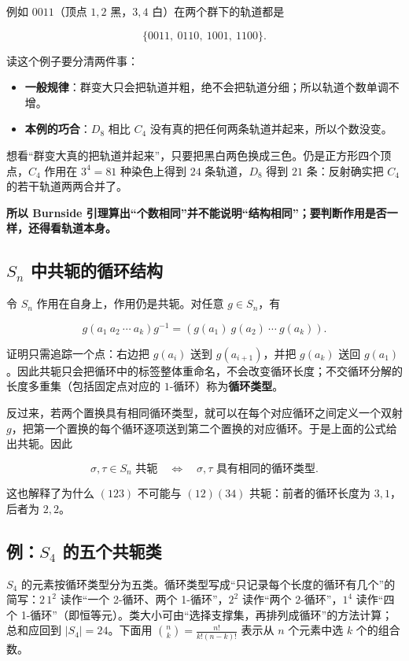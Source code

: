 例如 $0011$（顶点 $1,2$ 黑，$3,4$ 白）在两个群下的轨道都是

\[
\{0011,\ 0110,\ 1001,\ 1100\}.
\]

读这个例子要分清两件事：

\begin{itemize}
\item \textbf{一般规律}：群变大只会把轨道并粗，绝不会把轨道分细；所以轨道个数单调不增。
\item \textbf{本例的巧合}：$D_8$ 相比 $C_4$ 没有真的把任何两条轨道并起来，所以个数没变。
\end{itemize}


想看“群变大真的把轨道并起来”，只要把黑白两色换成三色。仍是正方形四个顶点，$C_4$ 作用在 $3^4=81$ 种染色上得到 $24$ 条轨道，$D_8$ 得到 $21$ 条：反射确实把 $C_4$ 的若干轨道两两合并了。

\textbf{所以 Burnside 引理算出“个数相同”并不能说明“结构相同”；要判断作用是否一样，还得看轨道本身。}

\subsection{$S_n$ 中共轭的循环结构}


令 $S_n$ 作用在自身上，作用仍是共轭。对任意 $g\in S_n$，有

\[
 g(a_1\ a_2\ \cdots\ a_k)g^{-1}
=(g(a_1)\ g(a_2)\ \cdots\ g(a_k)).
\]

证明只需追踪一个点：右边把 $g(a_i)$ 送到 $g(a_{i+1})$，并把 $g(a_k)$ 送回 $g(a_1)$。因此共轭只会把循环中的标签整体重命名，不会改变循环长度；不交循环分解的长度多重集（包括固定点对应的 $1$-循环）称为\textbf{循环类型}。

反过来，若两个置换具有相同循环类型，就可以在每个对应循环之间定义一个双射 $g$，把第一个置换的每个循环逐项送到第二个置换的对应循环。于是上面的公式给出共轭。因此

\[
\sigma,\tau\in S_n\text{ 共轭}
\quad\Longleftrightarrow\quad
\sigma,\tau\text{ 具有相同的循环类型}.
\]

这也解释了为什么 $(123)$ 不可能与 $(12)(34)$ 共轭：前者的循环长度为 $3,1$，后者为 $2,2$。

\subsection{例：$S_4$ 的五个共轭类}


$S_4$ 的元素按循环类型分为五类。循环类型写成“只记录每个长度的循环有几个”的简写：$2\,1^2$ 读作“一个 2-循环、两个 1-循环”，$2^2$ 读作“两个 2-循环”，$1^4$ 读作“四个 1-循环”（即恒等元）。类大小可由“选择支撑集，再排列成循环”的方法计算；总和应回到 $|S_4|=24$。下面用 $\binom nk=\frac{n!}{k!(n-k)!}$ 表示从 $n$ 个元素中选 $k$ 个的组合数。

